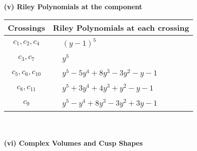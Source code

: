 \documentclass[1p]{elsarticle_modified}
\theoremstyle{definition}
\begin{document}
\newpage\renewcommand{\arraystretch}{1}
\flushleft \textbf{(v) Riley Polynomials at the component}\newline \\
\begin{tabular}{m{50pt}|m{274pt}}
Crossings & \hspace{64pt}Riley Polynomials at each crossing \\
\hline $$\begin{aligned}c_{1},c_{2},c_{4}\end{aligned}$$&$\begin{aligned}
&(y-1)^5
\end{aligned}$\\
\hline $$\begin{aligned}c_{3},c_{7}\end{aligned}$$&$\begin{aligned}
&y^5
\end{aligned}$\\
\hline $$\begin{aligned}c_{5},c_{6},c_{10}\end{aligned}$$&$\begin{aligned}
&y^5-5 y^4+8 y^3-3 y^2- y-1
\end{aligned}$\\
\hline $$\begin{aligned}c_{8},c_{11}\end{aligned}$$&$\begin{aligned}
&y^5+3 y^4+4 y^3+y^2- y-1
\end{aligned}$\\
\hline $$\begin{aligned}c_{9}\end{aligned}$$&$\begin{aligned}
&y^5- y^4+8 y^3-3 y^2+3 y-1
\end{aligned}$\\
\hline
\end{tabular}\\~\\
\newpage\flushleft \textbf{(vi) Complex Volumes and Cusp Shapes}
\end{document}
